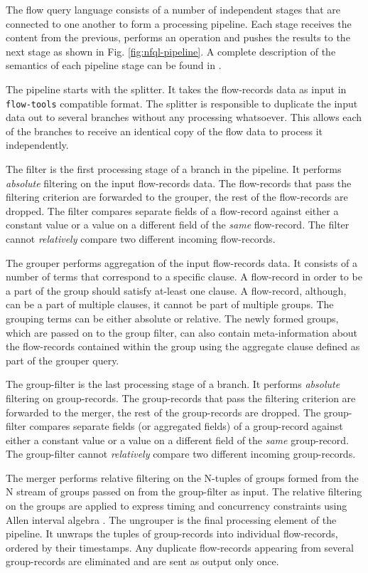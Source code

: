 The flow query language consists of a number of independent stages that are
connected to one another to form a processing pipeline.  Each stage receives
the content from the previous, performs an operation and pushes the results to
the next stage as shown in Fig. \ref{fig:nfql-pipeline}. A complete
description of the semantics of each pipeline stage can be found in
\cite{vmarinov:2009}.

The pipeline starts with the splitter. It takes the flow-records data as input
in \texttt{flow-tools} compatible format. The splitter is responsible to
duplicate the input data out to several branches without any processing
whatsoever. This allows each of the branches to receive an identical copy of
the flow data to process it independently.

The filter is the first processing stage of a branch in the pipeline.  It
performs \emph{absolute} filtering on the input flow-records data.  The
flow-records that pass the filtering criterion are forwarded to the grouper,
the rest of the flow-records are dropped. The filter compares separate fields
of a flow-record against either a constant value or a value on a different
field of the \emph{same} flow-record. The filter cannot \emph{relatively}
compare two different incoming flow-records.

The grouper performs aggregation of the input flow-records data. It consists
of a number of terms that correspond to a specific clause. A flow-record in
order to be a part of the group should satisfy at-least one clause. A
flow-record, although, can be a part of multiple clauses, it cannot be part of
multiple groups. The grouping terms can be either absolute or relative. The
newly formed groups, which are passed on to the group filter, can also contain
meta-information about the flow-records contained within the group using the
aggregate clause defined as part of the grouper query.

The group-filter is the last processing stage of a branch. It performs
\emph{absolute} filtering on group-records. The group-records
that pass the filtering criterion are forwarded to the merger, the rest of the
group-records are dropped. The group-filter compares separate fields (or
aggregated fields) of a group-record against either a constant value or a value
on a different field of the \emph{same} group-record. The group-filter cannot
\emph{relatively} compare two different incoming group-records.

The merger performs relative filtering on the N-tuples of groups formed from
the N stream of groups passed on from the group-filter as input. The relative
filtering on the groups are applied to express timing and concurrency
constraints using Allen interval algebra \cite{fallen:1983}. The ungrouper is
the final processing element of the pipeline. It unwraps the tuples of
group-records into individual flow-records, ordered by their timestamps. Any
duplicate flow-records appearing from several group-records are eliminated and
are sent as output only once.
